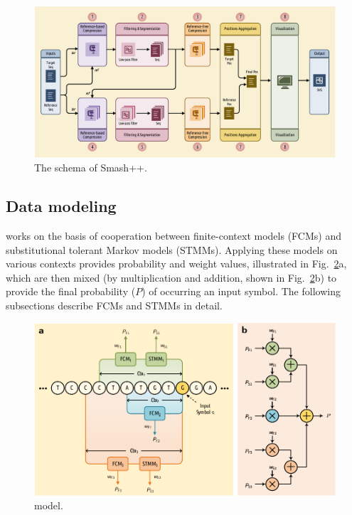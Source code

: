 \begin{figure}[!h]
\includegraphics[width=\linewidth]{schema.pdf}
\caption{The schema of Smash++.}
\label{fig.schema}
\end{figure}

\subsection{Data modeling}
\smashpp works on the basis of cooperation between finite-context models (FCMs) and substitutional tolerant Markov models (STMMs). Applying these models on various contexts provides probability and weight values, illustrated in Fig.~\ref{fig.model}a, which are then mixed (by multiplication and addition, shown in Fig.~\ref{fig.model}b) to provide the final probability ($P$) of occurring an input symbol. The following subsections describe FCMs and STMMs in detail.

\begin{figure}[!h]
  \centering
\includegraphics[width=.85\linewidth]{data_model.pdf}
\caption{model.}
\label{fig.model}
\end{figure}

